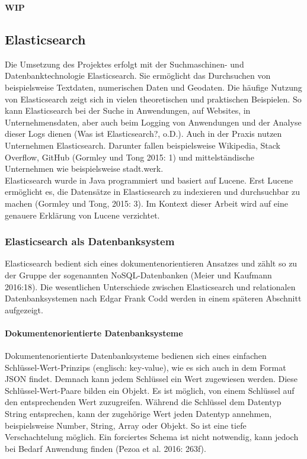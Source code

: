\documentclass[a4paper]{scrartcl}
\begin{document}
\textbf{WIP}


\subsection{Elasticsearch}
Die Umsetzung des Projektes erfolgt mit der Suchmaschinen- und Datenbanktechnologie Elasticsearch. Sie ermöglicht das Durchsuchen von beispielsweise Textdaten, numerischen Daten und Geodaten. Die häufige Nutzung von Elasticsearch zeigt sich in vielen theoretischen und praktischen Beispielen. So kann Elasticsearch bei der Suche in Anwendungen, auf Websites, in Unternehmensdaten, aber auch beim Logging von Anwendungen und der Analyse dieser Logs dienen (Was ist Elasticsearch?, o.D.). Auch in der Praxis nutzen Unternehmen Elasticsearch. Darunter fallen beispielsweise Wikipedia, Stack Overflow, GitHub (Gormley und Tong 2015: 1) und mittelständische Unternehmen wie beispielsweise stadt.werk. \\
Elasticsearch wurde in Java programmiert und basiert auf Lucene. Erst Lucene ermöglicht es, die Datensätze in Elasticsearch zu indexieren und durchsuchbar zu machen (Gormley und Tong, 2015: 3). Im Kontext dieser Arbeit wird auf eine genauere Erklärung von Lucene verzichtet.


\subsubsection{Elasticsearch als Datenbanksystem}
Elasticsearch bedient sich eines dokumentenorientieren Ansatzes und zählt so zu der Gruppe der sogenannten NoSQL-Datenbanken (Meier und Kaufmann 2016:18). Die wesentlichen Unterschiede zwischen Elasticsearch und relationalen Datenbanksystemen nach Edgar Frank Codd werden in einem späteren Abschnitt aufgezeigt. 

\paragraph{Dokumentenorientierte Datenbanksysteme}
Dokumentenorientierte Datenbanksysteme bedienen sich eines einfachen Schlüssel-Wert-Prinzips (englisch: key-value), wie es sich auch in dem Format JSON findet. Demnach kann jedem Schlüssel ein Wert zugewiesen werden. Diese Schlüssel-Wert-Paare bilden ein Objekt. Es ist möglich, von einem Schlüssel auf den entsprechenden Wert zuzugreifen. Während die Schlüssel dem Datentyp String entsprechen, kann der zugehörige Wert jeden Datentyp annehmen, beispielsweise Number, String, Array oder Objekt. So ist eine tiefe Verschachtelung möglich. Ein forciertes Schema ist nicht notwendig, kann jedoch bei Bedarf Anwendung finden (Pezoa et al. 2016: 263f).
\end{document}

